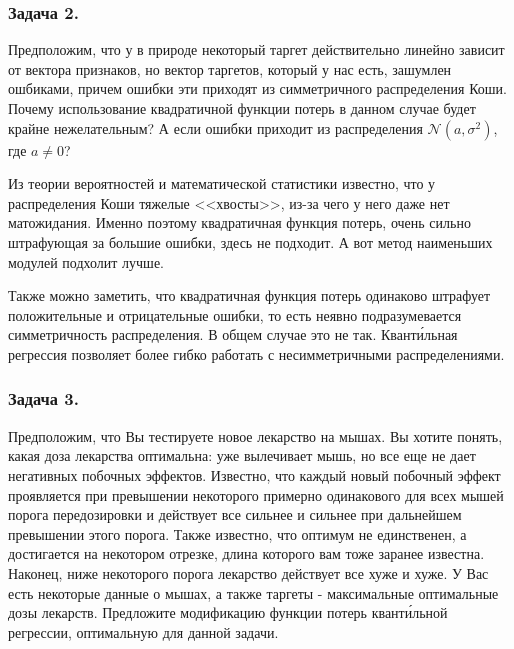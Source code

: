 \subsubsection*{Задача 2.}

Предположим, что у в природе некоторый таргет действительно линейно зависит от вектора признаков, но вектор таргетов, который у нас есть, зашумлен ошбиками, причем ошибки эти приходят из симметричного распределения Коши. Почему использование квадратичной функции потерь в данном случае будет крайне нежелательным? А если ошибки приходит из распределения $\mathcal{N}(a, \sigma^2)$, где $a \neq 0$?

\begin{solution}
    Из теории вероятностей и математической статистики известно, что у распределения Коши тяжелые <<хвосты>>, из-за чего у него даже нет матожидания. Именно поэтому квадратичная функция потерь, очень сильно штрафующая за большие ошибки, здесь не подходит. А вот метод наименьших модулей подхолит лучше.

    Также можно заметить, что квадратичная функция потерь одинаково штрафует положительные и отрицательные ошибки, то есть неявно подразумевается симметричность распределения. В общем случае это не так. Квант\'{и}льная регрессия позволяет более гибко работать с несимметричными распределениями.
\end{solution}

\subsubsection*{Задача 3.}

Предположим, что Вы тестируете новое лекарство на мышах. Вы хотите понять, какая доза лекарства оптимальна: уже вылечивает мышь, но все еще не дает негативных побочных эффектов. Известно, что каждый новый побочный эффект проявляется при превышении некоторого примерно одинакового для всех мышей порога передозировки и действует все сильнее и сильнее при дальнейшем превышении этого порога. Также известно, что оптимум не единственен, а достигается на некотором отрезке, длина которого вам тоже заранее известна. Наконец, ниже некоторого порога лекарство действует все хуже и хуже. У Вас есть некоторые данные о мышах, а также таргеты - максимальные оптимальные дозы лекарств. Предложите модификацию функции потерь квант\'{и}льной регрессии, оптимальную для данной задачи.

